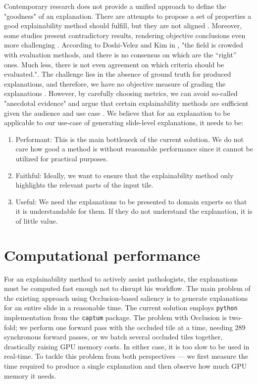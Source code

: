 Contemporary research does not provide a unified approach to define the "goodness" of an explanation.
There are attempts to propose a set of properties a good explainability method should fulfill, but they are not aligned \cite{xai-functionality-grounded, explainability-hard, xai-meta-survey, xai-zhou-survey}.
Moreover, some studies present contradictory results, rendering objective conclusions even more challenging \cite{xai-zhou-survey}.
According to Doshi-Velez and Kim in \cite{xai-doshi}, "the field is crowded with evaluation methods, and there is no consensus on which are the “right” ones. 
Much less, there is not even agreement on which criteria should be evaluated.".
The challenge lies in the absence of ground truth for produced explanations, and therefore, we have no objective measure of grading the explanations \cite{xai-zhou-survey}.
However, by carefully choosing metrics, we can avoid so-called "anecdotal evidence" and argue that certain explainability methods are sufficient given the audience and use case \cite{xai-anecdotal-evidence}.
We believe that for an explanation to be applicable to our use-case of generating slide-level explanations, it needs to be:
\begin{enumerate}
    \item Performant: This is the main bottleneck of the current solution. We do not care how good a method is without reasonable performance since it cannot be utilized for practical purposes.
    \item Faithful: Ideally, we want to ensure that the explainability method only highlights the relevant parts of the input tile.
    \item Useful: We need the explanations to be presented to domain experts so that it is understandable for them. If they do not understand the explanation, it is of little value. 
\end{enumerate}

\section{Computational performance}

For an explainability method to actively assist pathologists, the explanations must be computed fast enough not to disrupt his workflow.
The main problem of the existing approach using Occlusion-based saliency is to generate explanations for an entire slide in a reasonable time.
The current solution employs \texttt{python} implementation from the \texttt{captum} package.
The problem with Occlusion is two-fold; we perform one forward pass with the occluded tile at a time, needing $289$ synchronous forward passes, or we batch several occluded tiles together, drastically raising GPU memory costs.
In either case, it is too slow to be used in real-time.
To tackle this problem from both perspectives --- we first measure the time required to produce a single explanation and then observe how much GPU memory it needs.

